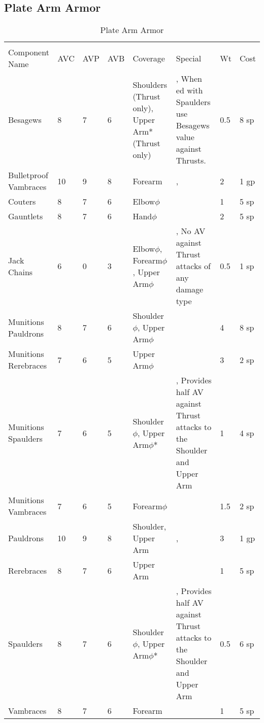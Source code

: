 \documentclass[oneside,11pt,english]{book}
\begin{document}
\subsection{Plate Arm Armor}
\begin{longtabu} to 
  \captionsetup{textformat=empty, labelformat=blank}
  \caption{Plate Arm Armor} \vspace{-15pt}
  \label{tab:Plate Arm Armor}\\
  Component Name&AVC&AVP&AVB& Coverage& Special& Wt&Cost\\\toprule
  Besagews& 8& 7& 6& Shoulders (Thrust only), Upper Arm* (Thrust only)& , When ed with Spaulders use Besagews value against Thrusts.& 0.5& 8 sp\\
  Bulletproof Vambraces& 10& 9& 8& Forearm& , & 2& 1 gp\\
  Couters& 8& 7& 6& Elbow\hyperref[sec:Weak Spots]{$\phi$}& & 1& 5 sp\\
  Gauntlets& 8& 7& 6& Hand\hyperref[sec:Weak Spots]{$\phi$}& & 2& 5 sp\\
  Jack Chains& 6& 0& 3& Elbow\hyperref[sec:Weak Spots]{$\phi$}, Forearm\hyperref[sec:Weak Spots]{$\phi$}, Upper Arm\hyperref[sec:Weak Spots]{$\phi$}& , No AV against Thrust attacks of any damage type& 0.5& 1 sp\\
  Munitions Pauldrons& 8& 7& 6& Shoulder\hyperref[sec:Weak Spots]{$\phi$}, Upper Arm\hyperref[sec:Weak Spots]{$\phi$}& & 4& 8 sp\\
  Munitions Rerebraces& 7& 6& 5& Upper Arm\hyperref[sec:Weak Spots]{$\phi$}& & 3& 2 sp\\
  Munitions Spaulders& 7& 6& 5& Shoulder\hyperref[sec:Weak Spots]{$\phi$}, Upper Arm\hyperref[sec:Weak Spots]{$\phi$}*& , Provides half AV against Thrust attacks to the Shoulder and Upper Arm& 1& 4 sp\\
  Munitions Vambraces& 7& 6& 5& Forearm\hyperref[sec:Weak Spots]{$\phi$}& & 1.5& 2 sp\\
  Pauldrons& 10& 9& 8& Shoulder, Upper Arm& , & 3& 1 gp\\
  Rerebraces& 8& 7& 6& Upper Arm& & 1& 5 sp\\
  Spaulders& 8& 7& 6& Shoulder\hyperref[sec:Weak Spots]{$\phi$}, Upper Arm\hyperref[sec:Weak Spots]{$\phi$}*& , Provides half AV against Thrust attacks to the Shoulder 
  and Upper Arm& 0.5& 6 sp\\
  Vambraces& 8& 7& 6& Forearm& & 1& 5 sp\\
\end{longtabu}
\end{document}
